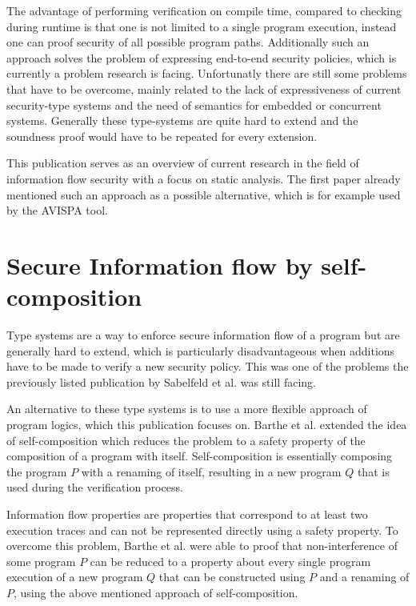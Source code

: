 \documentclass[a4paper,UKenglish]{lipics-v2018}
\begin{document}
The advantage of performing verification on compile time, compared to checking during runtime is that one is not limited to a single program execution, instead one can proof security of all possible program paths.\cite{language_based_information_flow_security} Additionally such an approach solves the problem of expressing end-to-end security policies, which is currently a problem research is facing. Unfortunatly there are still some problems that have to be overcome, mainly related to the lack of expressiveness of current security-type systems and the need of semantics for embedded or concurrent systems. Generally these type-systems are quite hard to extend and the soundness proof would have to be repeated for every extension.\cite{language_based_information_flow_security}

This publication serves as an overview of current research in the field of information flow security with a focus on static analysis. The first paper already mentioned such an approach as a possible alternative, which is for example used by the AVISPA tool.\cite{model_checking_security_protocols}





\section{Secure Information flow by self-composition}

Type systems are a way to enforce secure information flow of a program but are generally hard to extend, which is particularly disadvantageous when additions have to be made to verify a new security policy. This was one of the problems the previously listed publication by Sabelfeld et al. was still facing.
\cite{language_based_information_flow_security} 

An alternative to these type systems is to use a more flexible approach of program logics, which this publication focuses on. Barthe et al. extended the idea of self-composition which reduces the problem to a safety property of the composition of a program with itself. Self-composition is essentially composing the program $P$ with a renaming of itself, resulting in a new program $Q$ that is used during the verification process.
\cite{information_flow_by_self_composition}

Information flow properties are properties that correspond to at least two execution traces and can not be represented directly using a safety property. To overcome this problem, Barthe et al. were able to proof that non-interference of some program $P$ can be reduced to a property about every single program execution of a new program $Q$ that can be constructed using $P$ and a renaming of $P$, using the above mentioned approach of self-composition.
\cite{information_flow_by_self_composition}
\end{document}
